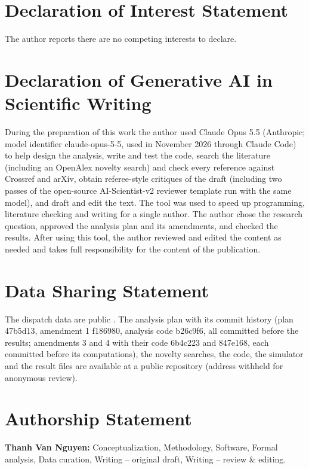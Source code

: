 \documentclass[11pt]{article}
\newcommand{\repoURL}{https://github.com/Thanh-Van-2001/conformal-staffing}
\newcommand{\repolink}{a public repository (address withheld for anonymous review)}
\newcommand{\repolink}{\url{\repoURL}}
\begin{document}
\section*{Declaration of Interest Statement}
The author reports there are no competing interests to declare.

\section*{Declaration of Generative AI in Scientific Writing}
During the preparation of this work the author used Claude Opus 5.5 (Anthropic; model identifier claude-opus-5-5, used in November 2026 through Claude Code) to help design the analysis, write and test the code, search the literature (including an OpenAlex novelty search) and check every reference against Crossref and arXiv, obtain referee-style critiques of the draft (including two passes of the open-source AI-Scientist-v2 reviewer template run with the same model), and draft and edit the text. The tool was used to speed up programming, literature checking and writing for a single author. The author chose the research question, approved the analysis plan and its amendments, and checked the results. After using this tool, the author reviewed and edited the content as needed and takes full responsibility for the content of the publication.

\section*{Data Sharing Statement}
The dispatch data are public \citep{nycems2026,sffire2026}. The analysis plan with its commit history (plan 47b5d13, amendment 1 f186980, analysis code b26c9f6, all committed before the results; amendments 3 and 4 with their code 6b4c223 and 847e168, each committed before its computations), the novelty searches, the code, the simulator and the result files are available at \repolink.

\ifdefined\ANON\else
\section*{Authorship Statement}
\textbf{Thanh Van Nguyen:} Conceptualization, Methodology, Software, Formal analysis, Data curation, Writing -- original draft, Writing -- review \& editing.
\fi




\clearpage
\appendix
\end{document}
